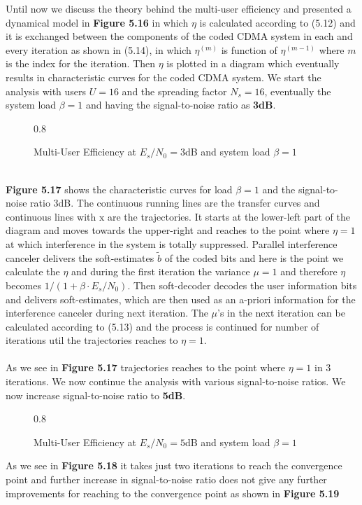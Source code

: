 Until now we discuss the theory behind the multi-user efficiency and presented a dynamical model in \textbf{Figure 5.16} in which $\eta$ is calculated according to (5.12) and it is exchanged between the components of the coded CDMA system in each and every iteration as shown in (5.14), in which $\eta^{(m)}$ is function of $\eta^{(m-1)}$ where $m$ is the index for the iteration. Then $\eta$ is plotted in a diagram which eventually results in characteristic curves for the coded CDMA system.\newpage
We start the analysis with users $U=16$ and the spreading factor $N_s=16$, eventually the system load $\beta=1$ and having the signal-to-noise ratio as \textbf{3dB}.
\begin{figure*}[htb]
\centerline{  {0.8}}
\caption{Multi-User Efficiency at $E_s/N_0=3$dB and system load $\beta=1$}
\end{figure*}\\
\textbf{Figure 5.17} shows the characteristic curves for load $\beta=1$ and the signal-to-noise ratio 3dB. The continuous running lines are the transfer curves and continuous lines with $\mathrm{x}$ are the trajectories. It starts at the lower-left part of the diagram and moves towards the upper-right and reaches to the point where $\eta=1$ at which interference in the system is totally suppressed. Parallel interference canceler delivers the soft-estimates $\tilde{b}$ of the coded bits and here is the point we calculate the $\eta$ and during the first iteration the variance $\mu=1$ and therefore $\eta$ becomes $1/(1+\beta\cdot E_s/N_0)$. Then soft-decoder decodes the user information bits and delivers soft-estimates, which are then used as an a-priori information for the interference canceler during next iteration. The $\mu$'s in the next iteration can be calculated according to (5.13) and the process is continued for number of iterations util the trajectories reaches to $\eta=1$. \\ \\
As we see in \textbf{Figure 5.17} trajectories reaches to the point where $\eta=1$ in 3 iterations. We now continue the analysis with various signal-to-noise ratios.
\newpage
We now increase signal-to-noise ratio to \textbf{5dB}.
\begin{figure*}[htb]
\centerline{  {0.8}}
\caption{Multi-User Efficiency at $E_s/N_0=5$dB and system load $\beta=1$}
\end{figure*}
As we see in \textbf{Figure 5.18} it takes just two iterations to reach the convergence point and further increase in signal-to-noise ratio does not give any further improvements for reaching to the convergence point as shown in \textbf{Figure 5.19}
